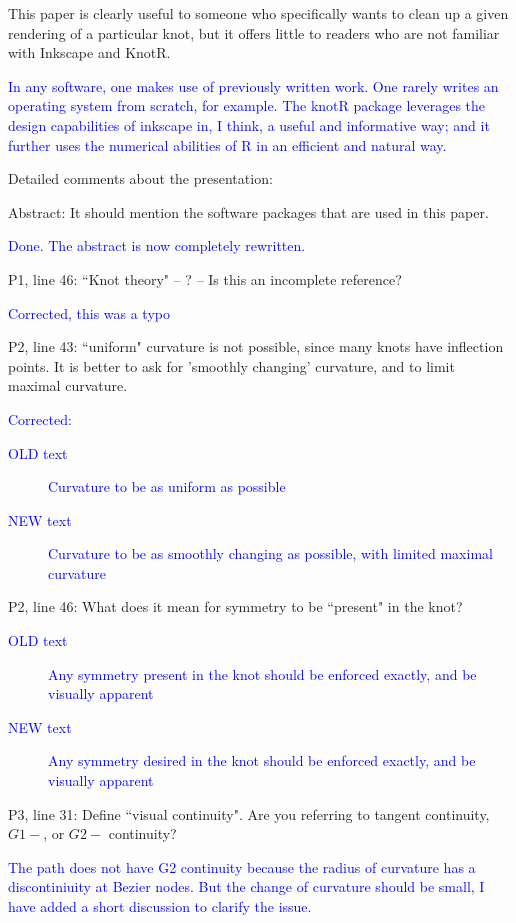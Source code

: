 \documentclass[12pt]{article}
\begin{document}
This paper is clearly useful to someone who specifically wants to
clean up a given rendering of a particular knot, but it offers little
to readers who are not familiar with Inkscape and KnotR.

\textcolor{blue}{In any software, one makes use of previously written
  work.  One rarely writes an operating system from scratch, for
  example.  The knotR package leverages the design capabilities of
  inkscape in, I think, a useful and informative way; and it further
  uses the numerical abilities of R in an efficient and natural way.}%


Detailed comments about the presentation:

Abstract: It should mention the software packages that are used in
this paper.

\textcolor{blue}{Done.  The abstract is now completely rewritten.}

P1, line 46:  ``Knot theory" -- ?  -- Is this an incomplete reference?

\textcolor{blue}{Corrected, this was a typo}

P2, line 43: ``uniform" curvature is not possible, since many knots
have inflection points.  It is better to ask for 'smoothly changing'
curvature, and to limit maximal curvature.

\textcolor{blue}{Corrected:
  \begin{description}
  \item[OLD text] Curvature to be as uniform as possible
\item[NEW text] Curvature to be as smoothly changing as possible, with
  limited maximal curvature
  \end{description}
}
  


P2, line 46: What does it mean for symmetry to be ``present" in the
knot?

\textcolor{blue}{
  \begin{description}
  \item[OLD text] Any symmetry present in the knot should be enforced exactly, and be visually apparent
\item[NEW text] Any symmetry desired in the knot should be enforced exactly, and be visually apparent
  \end{description}
}


P3, line 31: Define ``visual continuity".  Are you referring to tangent
continuity, $G1-$, or $G2-$ continuity?


\textcolor{blue}{%
  The path does not have G2 continuity because the radius of curvature
  has a discontiniuity at Bezier nodes.  But the change of curvature
  should be small, I have added a short discussion to clarify the
  issue.}
  
\end{document}
